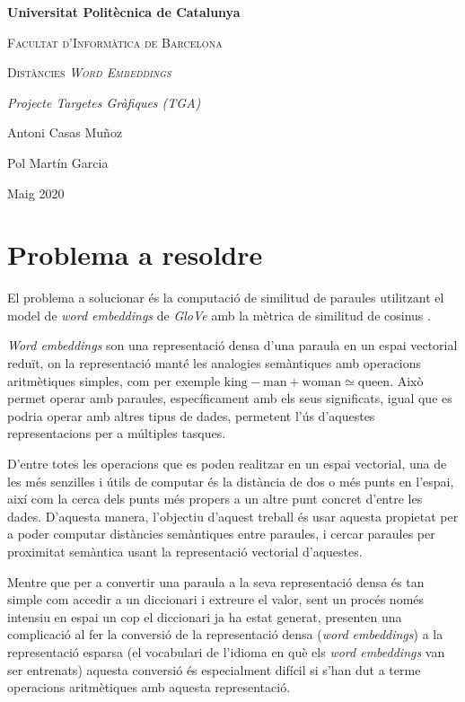 \documentclass[catalan,10pt,a4paper]{article}
\begin{document}
	\begin{titlepage}
		\centering
		{\bfseries\LARGE Universitat Politècnica de Catalunya \par}
		\vspace{1cm}
		{\scshape\Large Facultat d'Informàtica de Barcelona\par}
		\vspace{3cm}
		{\scshape\Huge Distàncies \textit{Word Embeddings} \par}
		\vspace{3cm}
		{\itshape\Large Projecte Targetes Gràfiques (TGA) \par}
		\vfill
		{\Large Antoni Casas Muñoz \par}
		{\Large Pol Martín Garcia \par}
		\vfill
		{\Large Maig 2020 \par}
	\end{titlepage}
	
	\newpage
	
\section*{Problema a resoldre}

El problema a solucionar és la computació de similitud de paraules utilitzant el model de \textit{word embeddings} de \textit{GloVe} \cite{GloVeGlo18:online} amb la mètrica de similitud de cosinus \cite{Cosinesi72:online}.

\textit{Word embeddings} son una representació densa d'una paraula en un espai vectorial reduït, on la representació manté les analogies semàntiques amb operacions aritmètiques simples, com per exemple $\text{king} - \text{man} + \text{woman} \simeq \text{queen}$. Això permet operar amb paraules, específicament amb els seus significats, igual que es podria operar amb altres tipus de dades, permetent l'ús d'aquestes representacions per a múltiples tasques.

D'entre totes les operacions que es poden realitzar en un espai vectorial, una de les més senzilles i útils de computar és la distància de dos o més punts en l'espai, així com la cerca dels punts més propers a un altre punt concret d'entre les dades. D'aquesta manera, l'objectiu d'aquest treball és usar aquesta propietat per a poder computar distàncies semàntiques entre paraules, i cercar paraules per proximitat semàntica usant la representació vectorial d'aquestes.

Mentre que per a convertir una paraula a la seva representació densa és tan simple com accedir a un diccionari i extreure el valor, sent un procés només intensiu en espai un cop el diccionari ja ha estat generat, presenten una complicació al fer la conversió de la representació densa (\textit{word embeddings}) a la representació esparsa (el vocabulari de l'idioma en què els \textit{word embeddings} van ser entrenats) aquesta conversió és especialment difícil si s'han dut a terme operacions aritmètiques amb aquesta representació.
\end{document}
